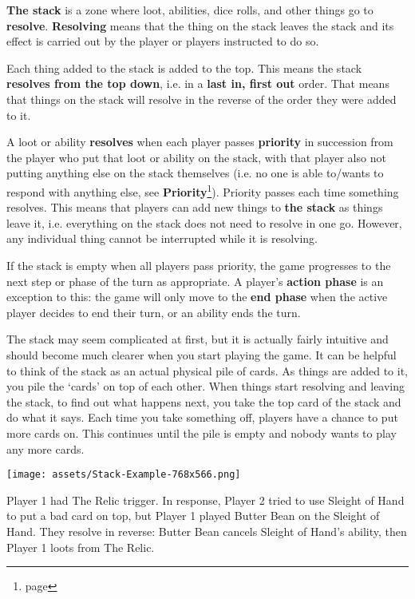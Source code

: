 \documentclass[10pt, a4paper, twoside]{article} %
\begin{document}
    \textbf{The stack} is a zone where loot, abilities, dice rolls, and other things go to \textbf{resolve}. \textbf{Resolving} means that the thing on the stack leaves the stack and its effect is carried out by the player or players instructed to do so.

    Each thing added to the stack is added to the top. This means the stack \textbf{resolves from the top down}, i.e. in a \textbf{last in, first out} order. That means that things on the stack will resolve in the reverse of the order they were added to it.

    A loot or ability \textbf{resolves} when each player passes \textbf{priority} in succession from the player who put that loot or ability on the stack, with that player also not putting anything else on the stack themselves (i.e. no one is able to/wants to respond with anything else, see \textbf{Priority}\footnote{page \pageref{priority}}). Priority passes each time something resolves. This means that players can add new things to \textbf{the stack} as things leave it, i.e. everything on the stack does not need to resolve in one go. However, any individual thing cannot be interrupted while it is resolving.

    If the stack is empty when all players pass priority, the game progresses to the next step or phase of the turn as appropriate. A player’s \textbf{action phase} is an exception to this: the game will only move to the \textbf{end phase} when the active player decides to end their turn, or an ability ends the turn.

    The stack may seem complicated at first, but it is actually fairly intuitive and should become much clearer when you start playing the game. It can be helpful to think of the stack as an actual physical pile of cards. As things are added to it, you pile the ‘cards’ on top of each other. When things start resolving and leaving the stack, to find out what happens next, you take the top card of the stack and do what it says. Each time you take something off, players have a chance to put more cards on. This continues until the pile is empty and nobody wants to play any more cards.

    \texttt{[image: assets/Stack-Example-768x566.png]}
    
    Player 1 had The Relic trigger. In response, Player 2 tried to use Sleight of Hand to put a bad card on top, but Player 1 played Butter Bean on the Sleight of Hand. They resolve in reverse: Butter Bean cancels Sleight of Hand’s ability, then Player 1 loots from The Relic.
\end{document}
